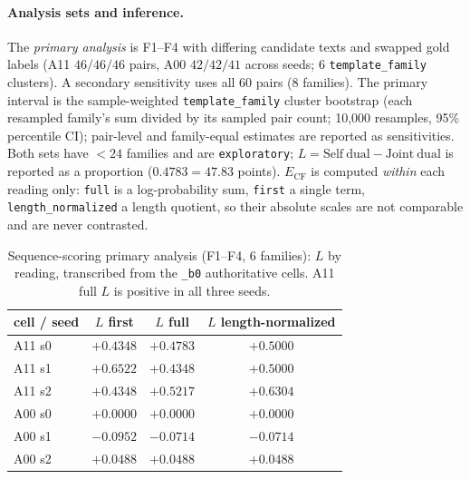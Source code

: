 \documentclass[11pt,twocolumn]{article}
\begin{document}
\paragraph{Analysis sets and inference.} The \emph{primary analysis} is F1--F4
with differing candidate texts and swapped gold labels (A11 $46/46/46$ pairs,
A00 $42/42/41$ across seeds; 6 \texttt{template\_family} clusters). A secondary
sensitivity uses all 60 pairs (8 families). The primary interval is the
sample-weighted \texttt{template\_family} cluster bootstrap (each resampled
family's sum divided by its sampled pair count; 10{,}000 resamples, 95\%
percentile CI); pair-level and family-equal estimates are reported as
sensitivities. Both sets have $<24$ families and are \texttt{exploratory};
$L=\mathrm{Self\ dual}-\mathrm{Joint\ dual}$ is reported as a proportion
($0.4783=47.83$ points). $E_{\mathrm{CF}}$ is computed \emph{within} each
reading only: \texttt{full} is a log-probability sum, \texttt{first} a single
term, \texttt{length\_normalized} a length quotient, so their absolute scales
are not comparable and are never contrasted.

\begin{table}[t]
\centering
\caption{Sequence-scoring primary analysis (F1--F4, 6 families): $L$ by reading,
transcribed from the \texttt{\_b0} authoritative cells. A11 full $L$ is positive
in all three seeds.}
\label{tab:seqL}
\begin{tabular}{lccc}
\toprule
cell / seed & $L$ first & $L$ full & $L$ length-normalized \\
\midrule
A11 s0 & $+0.4348$ & $+0.4783$ & $+0.5000$ \\
A11 s1 & $+0.6522$ & $+0.4348$ & $+0.5000$ \\
A11 s2 & $+0.4348$ & $+0.5217$ & $+0.6304$ \\
A00 s0 & $+0.0000$ & $+0.0000$ & $+0.0000$ \\
A00 s1 & $-0.0952$ & $-0.0714$ & $-0.0714$ \\
A00 s2 & $+0.0488$ & $+0.0488$ & $+0.0488$ \\
\bottomrule
\end{tabular}
\end{table}
\end{document}
